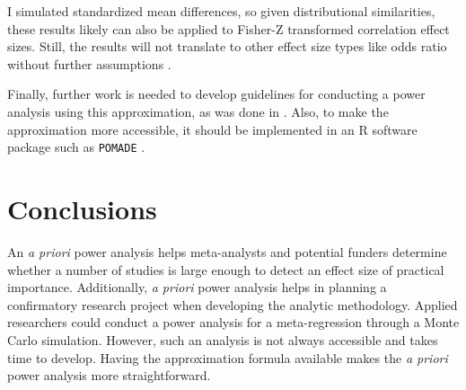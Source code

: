 
I simulated standardized mean differences, so given distributional similarities, these results likely can also be applied to Fisher-Z transformed correlation effect sizes. Still, the results will not translate to other effect size types like odds ratio without further assumptions \autocite{vembye2023}.

Finally, further work is needed to develop guidelines for conducting a power analysis using this approximation, as was done in \textcite{vembye2024}. Also, to make the approximation more accessible, it should be implemented in an R software package such as \texttt{POMADE} \autocite{POMADE}.


\section{Conclusions}

An \textit{a priori} power analysis helps meta-analysts and potential funders determine whether a number of studies is large enough to detect an effect size of practical importance. Additionally, \textit{a priori} power analysis helps in planning a confirmatory research project when developing the analytic methodology. Applied researchers could conduct a power analysis for a meta-regression through a Monte Carlo simulation. However, such an analysis is not always accessible and takes time to develop. Having the approximation formula available makes the \textit{a priori} power analysis more straightforward.







